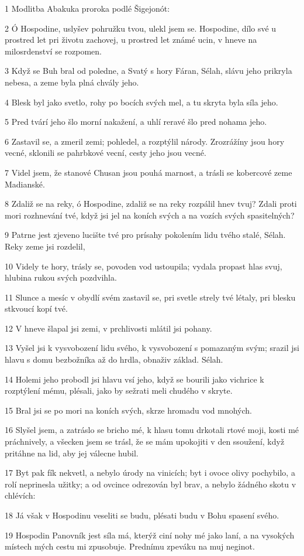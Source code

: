 \par 1 Modlitba Abakuka proroka podlé Šigejonót:
\par 2 Ó Hospodine, uslyšev pohružku tvou, ulekl jsem se. Hospodine, dílo své u prostred let pri životu zachovej, u prostred let známé ucin, v hneve na milosrdenství se rozpomen.
\par 3 Když se Buh bral od poledne, a Svatý s hory Fáran, Sélah, slávu jeho prikryla nebesa, a zeme byla plná chvály jeho.
\par 4 Blesk byl jako svetlo, rohy po bocích svých mel, a tu skryta byla síla jeho.
\par 5 Pred tvárí jeho šlo morní nakažení, a uhlí reravé šlo pred nohama jeho.
\par 6 Zastavil se, a zmeril zemi; pohledel, a rozptýlil národy. Zrozrážíny jsou hory vecné, sklonili se pahrbkové vecní, cesty jeho jsou vecné.
\par 7 Videl jsem, že stanové Chusan jsou pouhá marnost, a trásli se kobercové zeme Madianské.
\par 8 Zdaliž se na reky, ó Hospodine, zdaliž se na reky rozpálil hnev tvuj? Zdali proti mori rozhnevání tvé, když jsi jel na koních svých a na vozích svých spasitelných?
\par 9 Patrne jest zjeveno lucište tvé pro prísahy pokolením lidu tvého stalé, Sélah. Reky zeme jsi rozdelil,
\par 10 Videly te hory, trásly se, povoden vod ustoupila; vydala propast hlas svuj, hlubina rukou svých pozdvihla.
\par 11 Slunce a mesíc v obydlí svém zastavil se, pri svetle strely tvé létaly, pri blesku stkvoucí kopí tvé.
\par 12 V hneve šlapal jsi zemi, v prchlivosti mlátil jsi pohany.
\par 13 Vyšel jsi k vysvobození lidu svého, k vysvobození s pomazaným svým; srazil jsi hlavu s domu bezbožníka až do hrdla, obnaživ základ. Sélah.
\par 14 Holemi jeho probodl jsi hlavu vsí jeho, když se bourili jako vichrice k rozptýlení mému, plésali, jako by sežrati meli chudého v skryte.
\par 15 Bral jsi se po mori na koních svých, skrze hromadu vod mnohých.
\par 16 Slyšel jsem, a zatráslo se bricho mé, k hlasu tomu drkotali rtové moji, kosti mé práchnively, a všecken jsem se trásl, že se mám upokojiti v den ssoužení, když pritáhne na lid, aby jej válecne hubil.
\par 17 Byt pak fík nekvetl, a nebylo úrody na vinicích; byt i ovoce olivy pochybilo, a rolí neprinesla užitky; a od ovcince odrezován byl brav, a nebylo žádného skotu v chlévích:
\par 18 Já však v Hospodinu veseliti se budu, plésati budu v Bohu spasení svého.
\par 19 Hospodin Panovník jest síla má, kterýž ciní nohy mé jako laní, a na vysokých místech mých cestu mi zpusobuje. Prednímu zpeváku na muj neginot.

